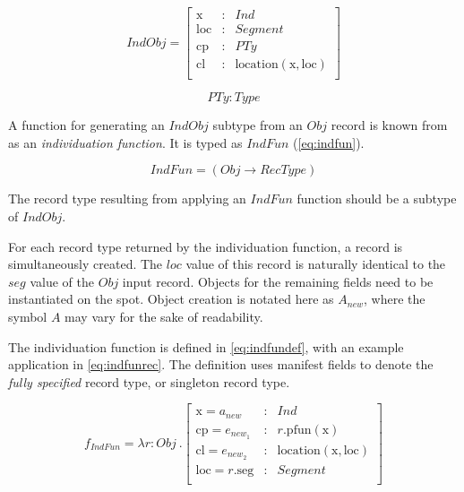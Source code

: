 \begin{equation}\label{eq:indobj}
IndObj = \left[\begin{array}{rcl}
\text{x} &:& Ind \\
\text{loc} &:& Segment \\
\text{cp} &:& PTy \\
\text{cl} &:& \text{location}(\text{x}, \text{loc}) \\
\end{array}\right]
\end{equation}

\begin{equation}\label{eq:pty}
PTy : Type
\end{equation}

A function for generating an $IndObj$ subtype from an $Obj$ record is known from \cite{lspc} as an \textit{individuation function}.
It is typed as $IndFun$ (\autoref{eq:indfun}).

\begin{equation}\label{eq:indfun}
IndFun = ( Obj \rightarrow RecType )
\end{equation}

The record type resulting from applying an $IndFun$ function should be a subtype of $IndObj$.

For each record type returned by the individuation function, a record is simultaneously created.
The $loc$ value of this record is naturally identical to the $seg$ value of the $Obj$ input record.
Objects for the remaining fields need to be instantiated on the spot.
Object creation is notated here as $A_{new}$, where the symbol $A$ may vary for the sake of readability.

The individuation function is defined in \autoref{eq:indfundef}, with an example application in \autoref{eq:indfunrec}.
The definition uses manifest fields to denote the \textit{fully specified} record type, or singleton record type.

\begin{equation}\label{eq:indfundef}
f_{IndFun} = \lambda r : Obj\ . \left[\begin{array}{lcl}
    \text{x} = a_{new} &:& Ind \\
    \text{cp} = e_{new_1} &:& r.\text{pfun}(\text{x}) \\
    \text{cl} = e_{new_2} &:& \text{location}(\text{x}, \text{loc}) \\
    \text{loc} = r.\text{seg} &:& Segment\\
\end{array}\right]
\end{equation}


